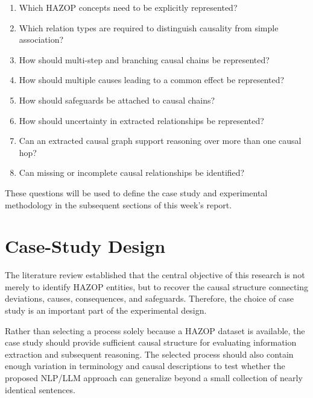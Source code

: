 \begin{enumerate}
    \item Which HAZOP concepts need to be explicitly represented?

    \item Which relation types are required to distinguish causality from
    simple association?

    \item How should multi-step and branching causal chains be represented?

    \item How should multiple causes leading to a common effect be
    represented?

    \item How should safeguards be attached to causal chains?

    \item How should uncertainty in extracted relationships be represented?

    \item Can an extracted causal graph support reasoning over more than one
    causal hop?

    \item Can missing or incomplete causal relationships be identified?
\end{enumerate}

These questions will be used to define the case study and experimental
methodology in the subsequent sections of this week's report.


\section{Case-Study Design}

The literature review established that the central objective of this
research is not merely to identify HAZOP entities, but to recover the
causal structure connecting deviations, causes, consequences, and
safeguards. Therefore, the choice of case study is an important part of
the experimental design.

Rather than selecting a process solely because a HAZOP dataset is
available, the case study should provide sufficient causal structure
for evaluating information extraction and subsequent reasoning. The
selected process should also contain enough variation in terminology
and causal descriptions to test whether the proposed NLP/LLM approach
can generalize beyond a small collection of nearly identical sentences.

